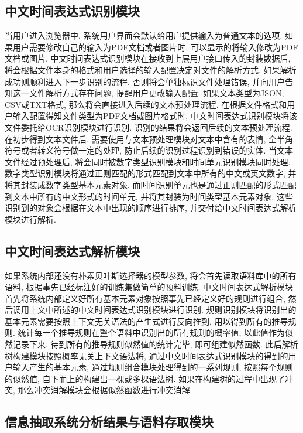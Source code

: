 \subsection{中文时间表达式识别模块}

当用户进入浏览器中, 系统用户界面会默认给用户提供输入为普通文本的选项. 如果用户需要修改自己的输入为PDF文档或者图片时, 可以显示的将输入修改为PDF文档或图片.
中文时间表达式识别模块在接收到上层用户接口传入的封装数据后, 将会根据文件本身的格式和用户选择的输入配置决定对文件的解析方式. 如果解析成功则顺利进入下一步识别的流程.
否则将会单独标识文件处理错误, 并向用户告知这一文件解析方式存在问题, 提醒用户更改输入配置.
如果文本类型为JSON, CSV或TXT格式, 那么将会直接进入后续的文本预处理流程.
在根据文件格式和用户输入配置得知文件类型为PDF文档或图片格式时, 中文时间表达式识别模块将该文件委托给OCR识别模块进行识别. 识别的结果将会返回后续的文本预处理流程.
在初步得到文本文件后, 需要使用与文本预处理模块对文本中含有的表情, 全半角符号或者转义符号做一定的处理, 防止后续的识别过程识别到错误的实体.
当文本文件经过预处理后, 将会同时被数字类型识别模块和时间单元识别模块同时处理.
数字类型识别模块将通过正则匹配的形式匹配到文本中所有的中文或英文数字, 并将其封装成数字类型基本元素对象.
而时间识别单元也是通过正则匹配的形式匹配到文本中所有的中文形式的时间单元, 并将其封装为时间类型基本元素对象.
这些识别到的对象会根据在文本中出现的顺序进行排序, 并交付给中文时间表达式解析模块进行解析.

\subsection{中文时间表达式解析模块}

如果系统内部还没有朴素贝叶斯选择器的模型参数, 将会首先读取语料库中的所有语料, 根据事先已经标注好的训练集做简单的预料训练.
中文时间表达式解析模块首先将系统内部定义好所有基本元素对象按照事先已经定义好的规则进行组合, 然后调用上文中所述的中文时间表达式识别模块进行识别.
规则识别模块将识别出的基本元素需要按照上下文无关语法的产生式进行反向推到, 用以得到所有的推导规则.
统计每一个推导规则在整个语料中识别出的所有规则的概率值, 以此值作为似然记录下来. 待到所有的推导规则似然值的统计完毕, 即可组建似然函数.
此后解析树构建模块按照概率无关上下文语法将, 通过中文时间表达式识别模块的得到的用户输入产生的基本元素, 通过规则组合模块处理得到的一系列规则,
按照每个规则的似然值, 自下而上的构建出一棵或多棵语法树.
如果在构建树的过程中出现了冲突, 那么冲突消解模块会根据似然函数进行冲突消解.

\subsection{信息抽取系统分析结果与语料存取模块}

